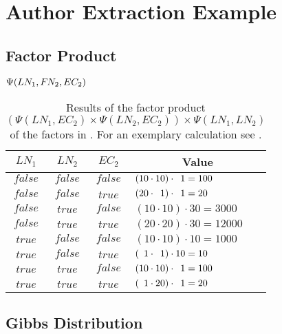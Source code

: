 \chapter{Author Extraction Example}\label{app:cha-author-extraction-example}

\section{Factor Product}\label{app:sec-factor-product}
\begin{table}[H]
\centering
$\Psi(LN_1,F\hspace{-0.07em} N_2,EC_2)$\par
\smallskip
\begin{tabular}{c c c l}
 \toprule
 $LN_1$ & $LN_2$ & $EC_2$ & \multicolumn{1}{c}{Value} \\
 \midrule
 $\mathit{false}$ & $\mathit{false}$ & $\mathit{false}$ & $(10\cdot10)\cdot\hphantom{0}1=100$\\
 $\mathit{false}$ & $\mathit{false}$ & $\mathit{true}$  & $(20\cdot\hphantom{0}1)\cdot\hphantom{0}1=20$\\
 $\mathit{false}$ & $\mathit{true}$  & $\mathit{false}$ & $(10\cdot10)\cdot30=\num{3000}$\\
 $\mathit{false}$ & $\mathit{true}$  & $\mathit{true}$  & $(20\cdot20)\cdot30=\num{12000}$\\
 $\mathit{true}$  & $\mathit{false}$ & $\mathit{false}$ & $(10\cdot10)\cdot10=\num{1000}$\\
 $\mathit{true}$  & $\mathit{false}$ & $\mathit{true}$  & $(\hphantom{0}1\cdot\hphantom{0}1)\cdot10=10$\\
 $\mathit{true}$  & $\mathit{true}$  & $\mathit{false}$ & $(10\cdot10)\cdot\hphantom{0}1=100$\\
 $\mathit{true}$  & $\mathit{true}$  & $\mathit{true}$  & $(\hphantom{0}1\cdot20)\cdot\hphantom{0}1=20$\\
 \bottomrule
\end{tabular}
\caption{Results of the \gls{factor product} $(\Psi(LN_1,EC_2)\times\Psi(LN_2,EC_2))\times\Psi(LN_1,LN_2)$ of the \glspl{factor} in . For an exemplary calculation see .}
\label{tab:example-factor-product}
\end{table}
\section{Gibbs Distribution}\label{app:sec-gibbs-distribution}
